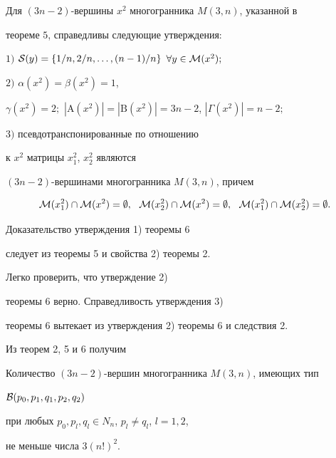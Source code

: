 \begin{thm}


Для $(3n-2)$-вершины $x^2$ многогранника $M(3,n)$, указанной в


теореме $5$, справедливы следующие утверждения\/${:}$





$1)$ ${\cal S}(y)=\{1/n,2/n,\dotsc,(n-1)/n\}$ $\forall y\in{\cal M}(x^2);$





$2)$ $\alpha(x^2)=\beta(x^2)=1$,


$\gamma(x^2)=2;$ $|\mathrm A(x^2)|=|\mathrm B


(x^2)|=3n-2$, $|\Gamma(x^2)|=n-2;$





$3)$ псевдотранспонированные по отношению 


к $x^2$ матрицы $x_1^2$, $x_2^2$ являются


$(3n-2)$-вершинами многогранника $M(3,n)$, причем


$$


{\cal M} (x_1^2)\cap{\cal M} (x^2)=\emptyset,\ \ 


{\cal M} (x_2^2)\cap{\cal M} (x^2)=\emptyset,\ \ {\cal M} (x_1^2)


\cap{\cal M} (x_2^2)=\emptyset.


$$


\end{thm}





Доказательство утверждения 1) теоремы 6 


следует из теоремы 5 и свойства 2) теоремы 2.


Легко проверить, что утверждение 2) 


теоремы 6 верно. Справедливость утверждения 3)


теоремы 6 вытекает из утверждения 2) теоремы 6 и следствия 2.





Из теорем 2, 5 и 6 получим





\begin{cor}


Количество $(3n-2)$-вершин многогранника $M(3,n)$, имеющих тип\linebreak


${\cal B}(p_0,p_1, q_1,p_2,q_2)$


при любых $p_0,p_l,q_l\in N_n$, $p_l\ne q_l$, $l=1,2$,


не меньше числа $3(n!)^2$.


\end{cor}





